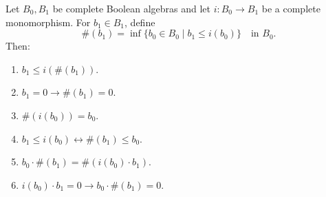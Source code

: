 Let $B_0, B_1$ be complete Boolean algebras and let $i: B_0 \rightarrow B_1$ be a complete monomorphism. For $b_1 \in B_1$, define
$$\#(b_1) = \inf \{b_0 \in B_0 \mid b_1 \leq i(b_0)\} \quad \text{in } B_0.$$
Then:

\begin{enumerate}
\item $b_1 \leq i(\#(b_1))$.
\item $b_1 = 0 \rightarrow \#(b_1) = 0$.
\item $\#(i(b_0)) = b_0$.
\item $b_1 \leq i(b_0) \leftrightarrow \#(b_1) \leq b_0$.
\item $b_0 \cdot \#(b_1) = \#(i(b_0) \cdot b_1)$.
\item $i(b_0) \cdot b_1 = 0 \rightarrow b_0 \cdot \#(b_1) = 0$.
\end{enumerate}
